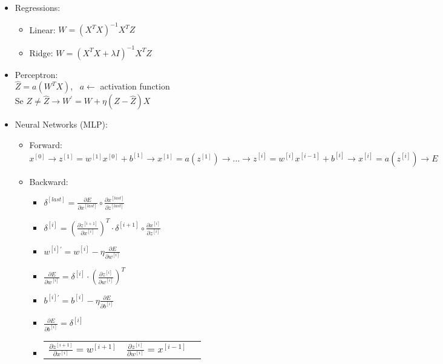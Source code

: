 \documentclass[twocolumn, 10pt]{article}
\begin{document}
\begin{itemize}[leftmargin=*, itemsep=0pt]
    \item Regressions:
    \begin{itemize}[topsep=0pt, itemsep=0pt]
        \item Linear: $W=(X^TX)^{-1}X^TZ$
        \item Ridge: $W=(X^TX+\lambda I)^{-1}X^TZ$
    \end{itemize}

    \item Perceptron: \\
    $\hat{Z}=a(W^TX)$, \ $a  \leftarrow$ activation function \\
    Se $Z \neq \hat{Z} \longrightarrow W^{'}=W+\eta(Z - \hat{Z})X$  

    \item Neural Networks (MLP):
    \begin{itemize}[topsep=0pt, itemsep=0pt]
        \item Forward: $x^{[0]}\rightarrow z^{[1]}=w^{[1]}x^{[0]}+b^{[1]}\rightarrow x^{[1]}=a\left(z^{[1]}\right) \rightarrow \ldots \rightarrow z^{[i]}=w^{[i]}x^{[i-1]}+b^{[i]} \rightarrow x^{[i]}=a\left(z^{[i]}\right) \rightarrow E $
        \item Backward:
        \begin{itemize}[topsep=0pt]
            \item $\displaystyle \delta^{[last]}=\frac{\partial E}{\partial x^{[last]}}\circ \frac{\partial x^{[last]}}{\partial z^{[last]}}$
            \item $\displaystyle \delta^{[i]}=\left(\frac{\partial z^{[i+1]}}{\partial x^{[i]}}\right)^T\cdot\delta^{[i+1]}\circ\frac{\partial x^{[i]}}{\partial z^{[i]}}$
            \item $\displaystyle w^{[i]'}=w^{[i]}-\eta\frac{\partial E}{\partial w^{[i]}}$
            \item $\displaystyle \frac{\partial E}{\partial w^{[i]}}=\delta^{[i]}\cdot \left(\frac{\partial z^{[i]}}{\partial w^{[i]}}\right)^T$
            \item $\displaystyle b^{[i]'}=b^{[i]}-\eta\frac{\partial E}{\partial b^{[i]}}$
            \item $\displaystyle \frac{\partial E}{\partial b^{[i]}}=\delta^{[i]}$
            \item
            \begin{tabular}{ M{7.2em} M{7em} M{4em} }
                $\displaystyle \frac{\partial z^{[i+1]}}{\partial x^{[i]}}=w^{[i+1]}$ &
                $\displaystyle \frac{\partial z^{[i]}}{\partial w^{[i]}}=x^{[i-1]}$ &

\end{tabular}
\end{itemize}
\end{itemize}
\end{itemize}
\end{document}
